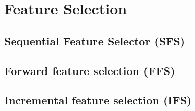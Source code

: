 \section{Feature Selection}\label{sec:feature_selection}

  \subsection{Sequential Feature Selector (SFS)}\label{fs:SFS}

  \subsection{Forward feature selection (FFS)}\label{fs:FFS}

  \subsection{Incremental feature selection (IFS)}\label{fs:IFS}

